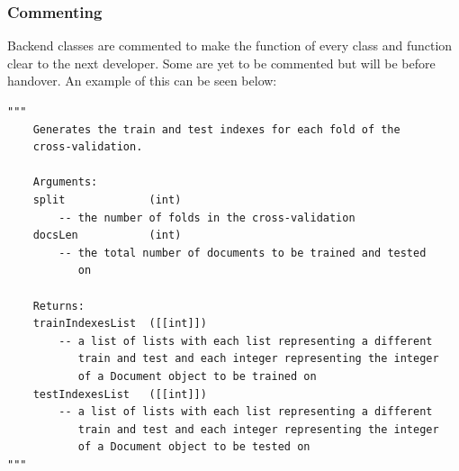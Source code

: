 			\subsubsection{Commenting}
				Backend classes are commented to make the function of every class and function clear to the next developer. Some are yet to be commented but will be before handover. An example of this can be seen below:
				\begin{lstlisting}
"""
    Generates the train and test indexes for each fold of the
    cross-validation.

    Arguments:
    split             (int)
    	-- the number of folds in the cross-validation
    docsLen           (int)
        -- the total number of documents to be trained and tested
           on

    Returns:
    trainIndexesList  ([[int]])
        -- a list of lists with each list representing a different
           train and test and each integer representing the integer
           of a Document object to be trained on
    testIndexesList   ([[int]])
        -- a list of lists with each list representing a different
           train and test and each integer representing the integer
           of a Document object to be tested on
"""
				\end{lstlisting}
